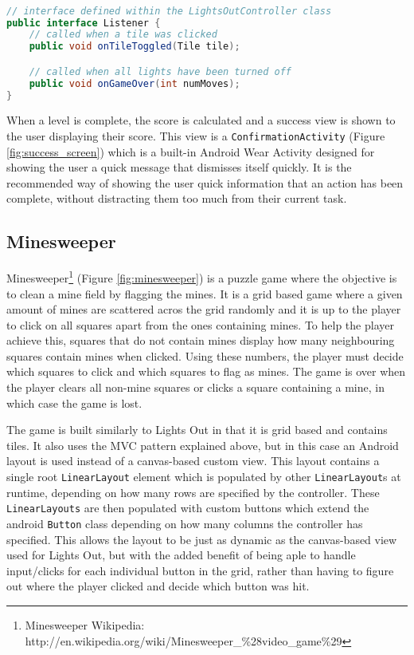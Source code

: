 \begin{lstlisting}[language=Java]

// interface defined within the LightsOutController class
public interface Listener {
    // called when a tile was clicked
    public void onTileToggled(Tile tile);

    // called when all lights have been turned off
    public void onGameOver(int numMoves);
}

\end{lstlisting}

When a level is complete, the score is calculated and a success view is shown
to the user displaying their score. This view is a \texttt{ConfirmationActivity}
(Figure \ref{fig:success_screen})
which is a built-in Android Wear Activity designed for showing the user a quick
message that dismisses itself quickly. It is the recommended way of showing the
user quick information that an action has been complete, without distracting
them too much from their current task.

\subsection{Minesweeper}

Minesweeper\footnote{Minesweeper Wikipedia: http://en.wikipedia.org/wiki/Minesweeper\_\%28video\_game\%29}
(Figure \ref{fig:minesweeper}) is a puzzle game where the objective is to clean
a mine field by flagging the mines. It is a grid based game where a given amount
of mines are scattered acros the grid randomly and it is up to the player to
click on all squares apart from the ones containing mines. To help the player
achieve this, squares that do not contain mines display how many neighbouring
squares contain mines when clicked. Using these numbers, the player must decide
which squares to click and which squares to flag as mines. The game is over when
the player clears all non-mine squares or clicks a square containing a mine, in
which case the game is lost.

The game is built similarly to Lights Out in that it is grid based and contains
tiles. It also uses the MVC pattern explained above, but in this case an Android
layout is used instead of a canvas-based custom view. This layout contains a
single root \texttt{LinearLayout} element which is populated by other 
\texttt{LinearLayout}s at runtime, depending on how many rows are specified by
the controller. These \texttt{LinearLayouts} are then populated with custom
buttons which extend the android \texttt{Button} class depending on how many
columns the controller has specified. This allows the layout to be just as
dynamic as the canvas-based view used for Lights Out, but with the added benefit
of being aple to handle input/clicks for each individual button in the grid,
rather than having to figure out where the player clicked and decide which
button was hit.

